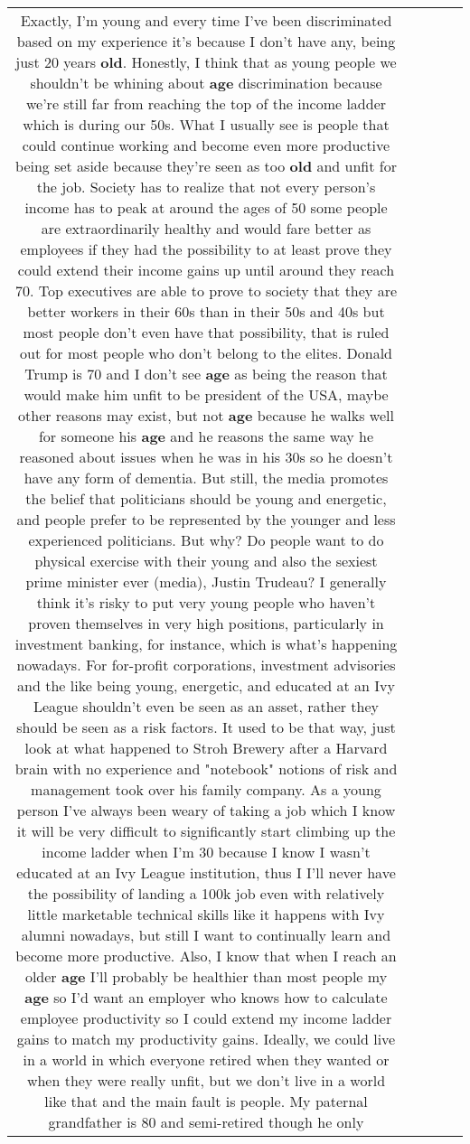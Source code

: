 \documentclass[11pt]{article}
\newlength\mylength
\begin{document}
\begin{center}
\begin{longtable}{|C{.65\mylength}|C{.30\mylength}|C{.12\mylength}|C{.12\mylength}|C{.12\mylength}|}
  \small Exactly, I'm young and every time I've been discriminated based on my experience it's because I don't have any, being just 20 years \textbf{old}. Honestly, I think that as young people we shouldn't be whining about \textbf{age} discrimination because we're still far from reaching the top of the income ladder which is during our 50s. What I usually see is people that could continue working and become even more productive being set aside because they're seen as too \textbf{old} and unfit for the job. Society has to realize that not every person's income has to peak at around the ages of 50 some people are extraordinarily healthy and would fare better as employees if they had the possibility to at least prove they could extend their income gains up until around they reach 70. Top executives are able to prove to society that they are better workers in their 60s than in their 50s and 40s but most people don't even have that possibility, that is ruled out for most people who don't belong to the elites. Donald Trump is 70 and I don't see \textbf{age} as being the reason that would make him unfit to be president of the USA, maybe other reasons may exist, but not \textbf{age} because he walks well for someone his \textbf{age} and he reasons the same way he reasoned about issues when he was in his 30s so he doesn't have any form of dementia. But still, the media promotes the belief that politicians should be young and energetic, and people prefer to be represented by the younger and less experienced politicians. But why? Do people want to do physical exercise with their young and also the sexiest prime minister ever (media), Justin Trudeau? I generally think it's risky to put very young people who haven't proven themselves in very high positions, particularly in investment banking, for instance, which is what's happening nowadays. For for-profit corporations, investment advisories and the like being young, energetic, and educated at an Ivy League shouldn't even be seen as an asset, rather they should be seen as a risk factors. It used to be that way, just look at what happened to Stroh Brewery after a Harvard brain with no experience and "notebook" notions of risk and management took over his family company. As a young person I've always been weary of taking a job which I know it will be very difficult to significantly start climbing up the income ladder when I'm 30 because I know I wasn't educated at an Ivy League institution, thus I I'll never have the possibility of landing a 100k job even with relatively little marketable technical skills like it happens with Ivy alumni nowadays, but still I want to continually learn and become more productive. Also, I know that when I reach an older \textbf{age} I'll probably be healthier than most people my \textbf{age} so I'd want an employer who knows how to calculate employee productivity so I could extend my income ladder gains to match my productivity gains. Ideally, we could live in a world in which everyone retired when they wanted or when they were really unfit, but we don't live in a world like that and the main fault is people. My paternal grandfather is 80 and semi-retired though he only 
\end{longtable}
\end{center}
\end{document}
